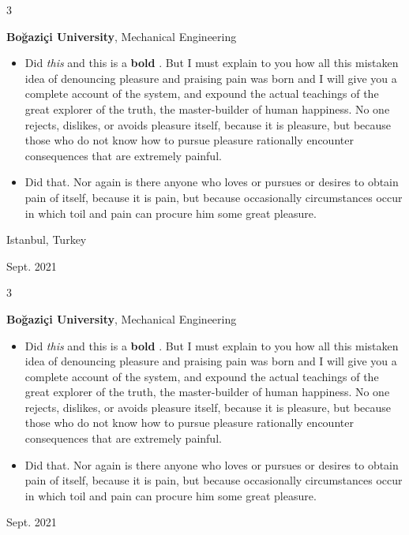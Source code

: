 \documentclass[10pt, letterpaper]{article}
\newenvironment{highlights}{
    \begin{itemize}[
        topsep=0.10 cm,
        parsep=0.10 cm,
        partopsep=0pt,
        itemsep=0pt,
        leftmargin=0.4 cm + 10pt
    ]
}{
    \end{itemize}
} %
\newenvironment{threecolentry}[3][]{
    \onecolentry
    \def\thirdColumn{#3}
    \setcolumnwidth{1 cm, \fill, 4.5 cm}
    \begin{paracol}{3}
    {\raggedright #2} \switchcolumn
}{
    \switchcolumn \raggedleft \thirdColumn
    \end{paracol}
    \endonecolentry
} %
\let\hrefWithoutArrow\href
\renewcommand{\href}[2]{\hrefWithoutArrow{#1}{\mbox{\ifthenelse{\equal{#2}{}}{ }{#2 }\raisebox{.15ex}{\footnotesize \faExternalLink*}}}}
\begin{document}
        \begin{threecolentry}{\textbf{}}{
            Istanbul, Turkey

        Sept. 2021
        }
            \textbf{Boğaziçi University}, Mechanical Engineering
            \begin{highlights}
                \item Did \textit{this} and this is a \textbf{bold} \href{https://example.com}{link}. But I must explain to you how all this mistaken idea of denouncing pleasure and praising pain was born and I will give you a complete account of the system, and expound the actual teachings of the great explorer of the truth, the master-builder of human happiness. No one rejects, dislikes, or avoids pleasure itself, because it is pleasure, but because those who do not know how to pursue pleasure rationally encounter consequences that are extremely painful.
                \item Did that. Nor again is there anyone who loves or pursues or desires to obtain pain of itself, because it is pain, but because occasionally circumstances occur in which toil and pain can procure him some great pleasure.
            \end{highlights}
        \end{threecolentry}

        \vspace{0.2 cm}

        \begin{threecolentry}{\textbf{}}{
            Sept. 2021
        }
            \textbf{Boğaziçi University}, Mechanical Engineering
            \begin{highlights}
                \item Did \textit{this} and this is a \textbf{bold} \href{https://example.com}{link}. But I must explain to you how all this mistaken idea of denouncing pleasure and praising pain was born and I will give you a complete account of the system, and expound the actual teachings of the great explorer of the truth, the master-builder of human happiness. No one rejects, dislikes, or avoids pleasure itself, because it is pleasure, but because those who do not know how to pursue pleasure rationally encounter consequences that are extremely painful.
                \item Did that. Nor again is there anyone who loves or pursues or desires to obtain pain of itself, because it is pain, but because occasionally circumstances occur in which toil and pain can procure him some great pleasure.
            \end{highlights}
        \end{threecolentry}
\end{document}
